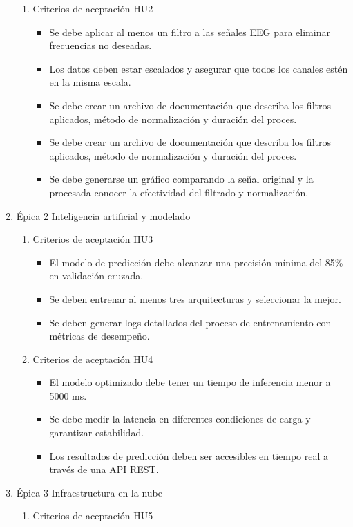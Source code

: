 \documentclass[
11pt, %
]{charter}
\begin{document}
\begin{enumerate}
\begin{enumerate}
		\item Criterios de aceptación HU2
			\begin{itemize}
			\item Se debe aplicar al menos un filtro a las señales EEG para eliminar frecuencias no deseadas.
			\item Los datos deben estar escalados y asegurar que todos los canales estén en la misma escala.
			\item Se debe crear un archivo de documentación que describa los filtros aplicados, método de normalización y duración del proces.
			\item Se debe crear un archivo de documentación que describa los filtros aplicados, método de normalización y duración del proces.
			\item Se debe generarse un gráfico comparando la señal original y la procesada conocer la efectividad del filtrado y normalización.
			\end{itemize}
	\end{enumerate}
	\item Épica 2 Inteligencia artificial y modelado
	\begin{enumerate}
		\item Criterios de aceptación HU3
			\begin{itemize}
			\item  El modelo de predicción debe alcanzar una precisión mínima del 85\% en validación cruzada.
			\item  Se deben entrenar al menos tres arquitecturas y seleccionar la mejor.
			\item  Se deben generar logs detallados del proceso de entrenamiento con métricas de desempeño.
			\end{itemize}
		\item Criterios de aceptación HU4
			\begin{itemize}
			\item  El modelo optimizado debe tener un tiempo de inferencia menor a 5000 ms.
			\item  Se debe medir la latencia en diferentes condiciones de carga y garantizar estabilidad.
			\item Los resultados de predicción deben ser accesibles en tiempo real a través de una API REST.
			\end{itemize}
	\end{enumerate}
	\item Épica 3 Infraestructura en la nube
	\begin{enumerate}
		\item Criterios de aceptación HU5

\end{enumerate}
\end{enumerate}
\end{document}
